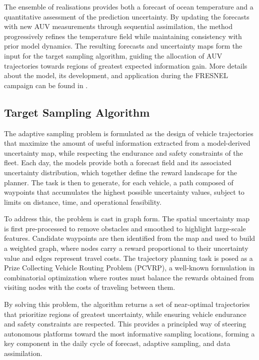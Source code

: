The ensemble of realisations provides both a forecast of ocean temperature and a quantitative assessment of the prediction uncertainty. By updating the forecasts with new AUV measurements through sequential assimilation, the method progressively refines the temperature field while maintaining consistency with prior model dynamics. The resulting forecasts and uncertainty maps form the input for the target sampling algorithm, guiding the allocation of AUV trajectories towards regions of greatest expected information gain. More details about the model, its development, and application during the FRESNEL campaign can be found in \cite{Duarte2025}.

\subsection{Target Sampling Algorithm}

The adaptive sampling problem is formulated as the design of vehicle trajectories that maximize the amount of useful information extracted from a model-derived uncertainty map, while respecting the endurance and safety constraints of the fleet. Each day, the models provide both a forecast field and its associated uncertainty distribution, which together define the reward landscape for the planner. The task is then to generate, for each vehicle, a path composed of waypoints that accumulates the highest possible uncertainty values, subject to limits on distance, time, and operational feasibility.

To address this, the problem is cast in graph form. The spatial uncertainty map is first pre-processed to remove obstacles and smoothed to highlight large-scale features. Candidate waypoints are then identified from the map and used to build a weighted graph, where nodes carry a reward proportional to their uncertainty value and edges represent travel costs. The trajectory planning task is posed as a Prize Collecting Vehicle Routing Problem (PCVRP)\cite{vidal2013,toth2014vehicle}, a well-known formulation in combinatorial optimization where routes must balance the rewards obtained from visiting nodes with the costs of traveling between them.

By solving this problem, the algorithm returns a set of near-optimal trajectories that prioritize regions of greatest uncertainty, while ensuring vehicle endurance and safety constraints are respected. This provides a principled way of steering autonomous platforms toward the most informative sampling locations, forming a key component in the daily cycle of forecast, adaptive sampling, and data assimilation.

